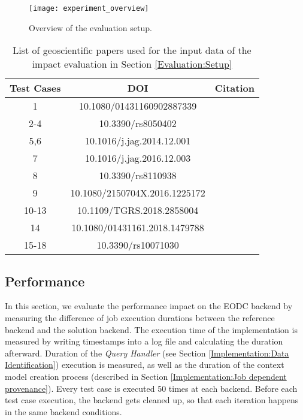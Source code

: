 \documentclass[draft,final]{vutinfth} %
\begin{document}
\begin{figure}[h]
	\centering
	\texttt{[image: experiment\_overview]}
	\caption{Overview of the evaluation setup.}
	\label{fig:experiment_overview} %
\end{figure}

\begin{table}[]
	\caption{List of geoscientific papers used for the input data of the impact evaluation in Section \ref{Evaluation:Setup}}
	\centering
	\begin{tabular}{c|c|c}
		\textbf{Test Cases} & \textbf{DOI} & \textbf{Citation}  \\ \hline
		1 & 10.1080/01431160902887339 & \cite{evaluation1} \\ 
		2-4 & 10.3390/rs8050402 & \cite{evaluation2} \\ 
		5,6 & 10.1016/j.jag.2014.12.001  & \cite{evaluation3} \\
		7 & 10.1016/j.jag.2016.12.003  & \cite{evaluation4} \\
		8 & 10.3390/rs8110938  & \cite{evaluation5} \\
		9 & 10.1080/2150704X.2016.1225172  & \cite{evaluation6} \\
		10-13 & 10.1109/TGRS.2018.2858004  & \cite{evaluation7} \\
		14 & 10.1080/01431161.2018.1479788  & \cite{evaluation8} \\
		15-18 & 10.3390/rs10071030  & \cite{evaluation9} \\
	\end{tabular}
	\label{Tab:appendix}
\end{table}

\subsection{Performance}\label{Evaluation:impact_perf}

In this section, we evaluate the performance impact on the EODC backend by measuring the difference of job execution durations between the reference backend and the solution backend. The execution time of the implementation is measured by writing timestamps into a log file and calculating the duration afterward. Duration of the \textit{Query Handler} (see Section \ref{Implementation:Data Identification}) execution is measured, as well as the duration of the context model creation process (described in Section \ref{Implementation:Job dependent provenance}). Every test case is executed 50 times at each backend. Before each test case execution, the backend gets cleaned up, so that each iteration happens in the same backend conditions. 
\end{document}
